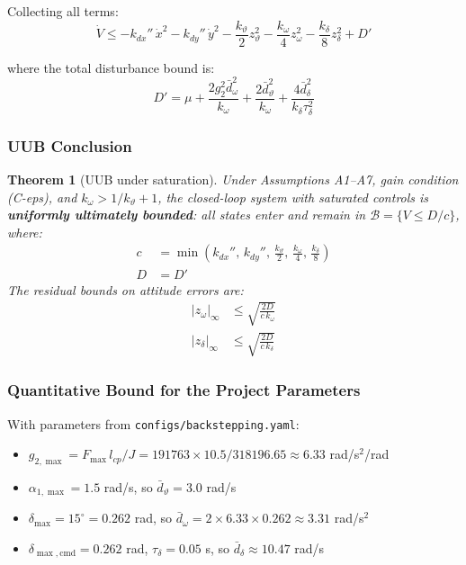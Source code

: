 \documentclass[11pt,a4paper]{article}
\theoremstyle{plain}
\newtheorem{theorem}{Theorem}[section]
\theoremstyle{remark}
\newcommand{\vth}{\vartheta}
\newcommand{\zth}{z_{\vth}}
\newcommand{\zom}{z_{\omega}}
\newcommand{\zdel}{z_{\delta}}
\newcommand{\dmax}{\delta_{\max}}
\newcommand{\Fmax}{F_{\max}}
\begin{document}
Collecting all terms:
\begin{equation}
  \dot V \leq -k_{dx}''\,\dot x^2 - k_{dy}''\,\dot y^2 - \frac{k_\vth}{2}\zth^2 - \frac{k_\omega}{4}\zom^2 - \frac{k_\delta}{8}\zdel^2 + D'
  \tag{ISS4}
\end{equation}

where the total disturbance bound is:
\begin{equation}
  D' = \mu + \frac{2g_2^2\bar{d}_\omega^2}{k_\omega} + \frac{2\bar{d}_\vartheta^2}{k_\omega} + \frac{4\bar{d}_\delta^2}{k_\delta\tau_\delta^2}
\end{equation}

\subsubsection{UUB Conclusion}

\begin{theorem}[UUB under saturation]
Under Assumptions A1--A7, gain condition (C-eps), and $k_\omega > 1/k_\vth + 1$, the closed-loop system with saturated controls is \textbf{uniformly ultimately bounded}: all states enter and remain in $\mathcal{B} = \{V \leq D/c\}$, where:
\begin{align}
  c &= \min\!\left(k_{dx}'',\, k_{dy}'',\, \frac{k_\vth}{2},\, \frac{k_\omega}{4},\, \frac{k_\delta}{8}\right) \\
  D &= D'
\end{align}
The residual bounds on attitude errors are:
\begin{align}
  |z_\omega|_{\infty} &\leq \sqrt{\frac{2D}{c\,k_\omega}} \\
  |z_\delta|_{\infty} &\leq \sqrt{\frac{2D}{c\,k_\delta}}
\end{align}
\end{theorem}

\subsubsection{Quantitative Bound for the Project Parameters}

With parameters from \texttt{configs/backstepping.yaml}:
\begin{itemize}
  \item $g_{2,\max} = \Fmax\,l_{cp}/J = 191763 \times 10.5 / 318196.65 \approx 6.33$ rad/s$^2$/rad
  \item $\alpha_{1,\max} = 1.5$ rad/s, so $\bar{d}_\vartheta = 3.0$ rad/s
  \item $\dmax = 15^{\circ} = 0.262$ rad, so $\bar{d}_\omega = 2 \times 6.33 \times 0.262 \approx 3.31$ rad/s$^2$
  \item $\delta_{\max,\mathrm{cmd}} = 0.262$ rad, $\tau_\delta = 0.05$ s, so $\bar{d}_\delta \approx 10.47$ rad/s
\end{itemize}
\end{document}
